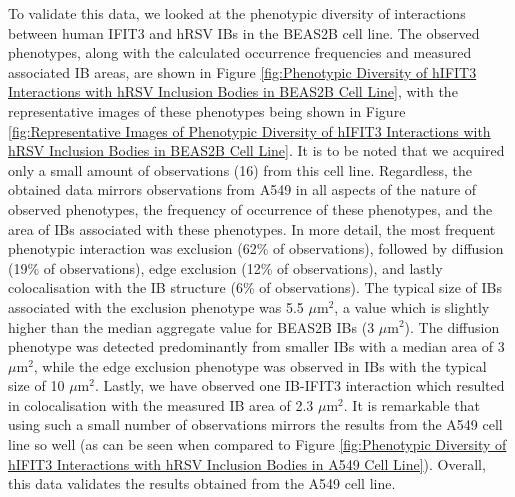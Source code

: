 To validate this data, we looked at the phenotypic diversity of interactions between human IFIT3 and hRSV IBs in the BEAS2B cell line. The observed phenotypes, along with the calculated occurrence frequencies and measured associated IB areas, are shown in Figure \ref{fig:Phenotypic Diversity of hIFIT3 Interactions with hRSV Inclusion Bodies in BEAS2B Cell Line}, with the representative images of these phenotypes being shown in Figure \ref{fig:Representative Images of Phenotypic Diversity of hIFIT3 Interactions with hRSV Inclusion Bodies in BEAS2B Cell Line}. It is to be noted that we acquired only a small amount of observations (16) from this cell line. Regardless, the obtained data mirrors observations from A549 in all aspects of the nature of observed phenotypes, the frequency of occurrence of these phenotypes, and the area of IBs associated with these phenotypes. In more detail, the most frequent phenotypic interaction was exclusion (62\% of observations), followed by diffusion (19\% of observations), edge exclusion (12\% of observations), and lastly colocalisation with the IB structure (6\% of observations). The typical size of IBs associated with the exclusion phenotype was 5.5 \(\mu \mbox{m}^2\), a value which is slightly higher than the median aggregate value for BEAS2B IBs (3 \(\mu \mbox{m}^2\)). The diffusion phenotype was detected predominantly from smaller IBs with a median area of 3 \(\mu \mbox{m}^2\), while the edge exclusion phenotype was observed in IBs with the typical size of 10 \(\mu \mbox{m}^2\). Lastly, we have observed one IB-IFIT3 interaction which resulted in colocalisation with the measured IB area of 2.3 \(\mu \mbox{m}^2\). It is remarkable that using such a small number of observations mirrors the results from the A549 cell line so well (as can be seen when compared to Figure \ref{fig:Phenotypic Diversity of hIFIT3 Interactions with hRSV Inclusion Bodies in A549 Cell Line}). Overall, this data validates the results obtained from the A549 cell line.

